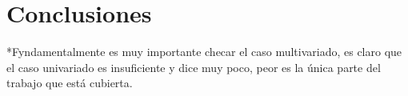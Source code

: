 
\section{Conclusiones}

*Fyndamentalmente es muy importante checar el caso multivariado, es claro que el caso univariado
es insuficiente y dice muy poco, peor es la \'unica parte del trabajo que est\'a cubierta.


